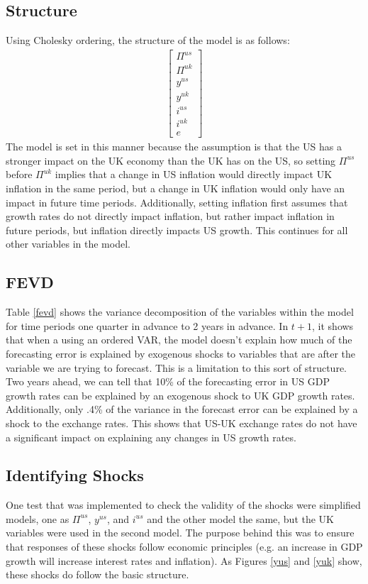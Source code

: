 \documentclass[12pt]{article}
\begin{document}
\subsection{Structure}
Using Cholesky ordering, the structure of the model is as follows:
\begin{align*}
\begin{bmatrix}
\Pi^{us}\\
\Pi^{uk}\\
y^{us}\\
y^{uk}\\
i^{us}\\
i^{uk}\\
e
\end{bmatrix}
\end{align*}
The model is set in this manner because the assumption is that the US has a stronger impact on the UK economy than the UK has on the US, so setting $\Pi^{us}$ before $\Pi^{uk}$ implies that a change in US inflation would directly impact UK inflation in the same period, but a change in UK inflation would only have an impact in future time periods. Additionally, setting inflation first assumes that growth rates do not directly impact inflation, but rather impact inflation in future periods, but inflation directly impacts US growth. This continues for all other variables in the model.
\subsection{FEVD}
Table \ref{fevd} shows the variance decomposition of the variables within the model for time periods one quarter in advance to 2 years in advance. In $t+1$, it shows that when a using an ordered VAR, the model doesn't explain how much of the forecasting error is explained by exogenous shocks to variables that are after the variable we are trying to forecast. This is a limitation to this sort of structure. 
Two years ahead, we can tell that 10\% of the forecasting error in US GDP growth rates can be explained by an exogenous shock to UK GDP growth rates. Additionally, only .4\% of the variance in the forecast error can be explained by a shock to the exchange rates. This shows that US-UK exchange rates do not have a significant impact on explaining any changes in US growth rates. 
\subsection{Identifying Shocks}
One test that was implemented to check the validity of the shocks were simplified models, one as $\Pi^{us}$, $y^{us}$, and $i^{us}$ and the other model the same, but the UK variables were used in the second model. The purpose behind this was to ensure that responses of these shocks follow economic principles (e.g. an increase in GDP growth will increase interest rates and inflation). As Figures \ref{yus} and \ref{yuk} show, these shocks do follow the basic structure.
\end{document}
